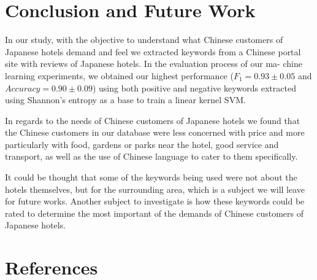 \documentclass[review]{elsarticle}
\begin{document}
\section{Conclusion and Future Work}

In our study, with the objective to understand what Chinese customers of Japanese hotels demand and feel we extracted keywords from a Chinese portal site with reviews of Japanese hotels. In the evaluation process of our ma- chine learning experiments, we obtained our highest performance (\(F_{1} = 0.93 \pm 0.05\) and \(Accuracy = 0.90 \pm 0.09\)) using both positive and negative keywords extracted using Shannon’s entropy as a base to train a linear kernel SVM.

In regards to the needs of Chinese customers of Japanese hotels we found that the Chinese customers in our database were less concerned with price and more particularly with food, gardens or parks near the hotel, good service and transport, as well as the use of Chinese language to cater to them specifically.

It could be thought that some of the keywords being used were not about the hotels themselves, but for the surrounding area, which is a subject we will leave for future works. Another subject to investigate is how these keywords could be rated to determine the most important of the demands of Chinese customers of Japanese hotels.

\clearpage

\section*{References}


\end{document}
